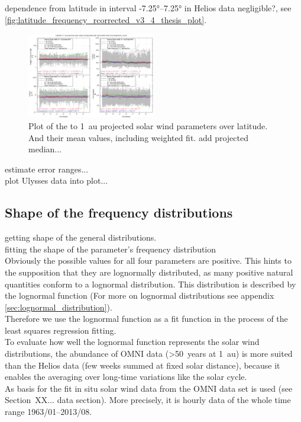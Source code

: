 dependence from latitude in interval -7.25°--7.25° in Helios data negligible?, see \autoref{fig:latitude_frequency_rcorrected_v3_4_thesis_plot}.
\begin{figure}[htb]
	\centering
	\includegraphics[width=0.5\textwidth]{images/gnuplots/latitude_frequency_rcorrected_v3_4_thesis_plot.png}
	\caption{Plot of the to 1~au projected solar wind parameters over latitude. And their mean values, including weighted fit. add projected median...}
	\label{fig:latitude_frequency_rcorrected_v3_4_thesis_plot}
\end{figure}
estimate error ranges...\\

plot Ulysses data into plot...\\

\subsection{Shape of the frequency distributions}
getting shape of the general distributions.\\

fitting the shape of the parameter's frequency distribution\\

Obviously the possible values for all four parameters are positive. This hints to the supposition that they are lognormally distributed, as many positive natural quantities conform to a lognormal distribution. This distribution is described by the lognormal function (For more on lognormal distributions see appendix \autoref{sec:lognormal_distribution}).\\

Therefore we use the lognormal function as a fit function in the process of the least squares regression fitting.\\
To evaluate how well the lognormal function represents the solar wind distributions, the abundance of OMNI data (>50~years at 1~au) is more suited than the Helios data (few weeks summed at fixed solar distance), because it enables the averaging over long-time variations like the solar cycle.\\
As basis for the fit in situ solar wind data from the OMNI data set is used (see Section~XX... data section). More precisely, it is hourly data of the whole time range 1963/01--2013/08.\\

